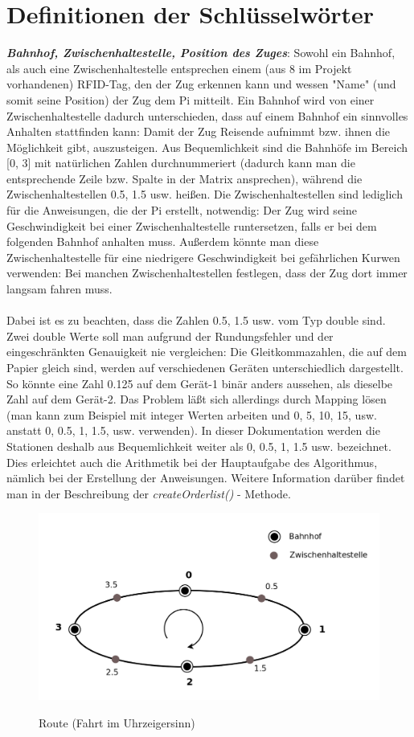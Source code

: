 \section{Definitionen der Schlüsselwörter}
\label{chap:alg_keywords}
\textit{\textbf{Bahnhof, Zwischenhaltestelle, Position des Zuges}}: Sowohl ein Bahnhof, als auch eine Zwischenhaltestelle entsprechen einem (aus 8 im Projekt vorhandenen) RFID-Tag, den der Zug erkennen kann und wessen "Name" (und somit seine Position) der Zug dem Pi mitteilt. Ein Bahnhof wird von einer Zwischenhaltestelle dadurch unterschieden, dass auf einem Bahnhof ein sinnvolles Anhalten stattfinden kann: Damit der Zug Reisende aufnimmt bzw. ihnen die Möglichkeit gibt, auszusteigen. Aus Bequemlichkeit sind die Bahnhöfe im Bereich [0, 3] mit natürlichen Zahlen durchnummeriert (dadurch kann man die entsprechende Zeile bzw. Spalte in der Matrix ansprechen), während die Zwischenhaltestellen 0.5, 1.5 usw. heißen. Die Zwischenhaltestellen sind lediglich für die Anweisungen, die der Pi erstellt, notwendig: Der Zug wird seine Geschwindigkeit bei einer Zwischenhaltestelle runtersetzen, falls er bei dem folgenden Bahnhof anhalten muss. Außerdem könnte man diese Zwischenhaltestelle für eine niedrigere Geschwindigkeit bei gefährlichen Kurwen verwenden: Bei manchen Zwischenhaltestellen festlegen, dass der Zug dort immer langsam fahren muss.\\
\\
Dabei ist es zu beachten, dass die Zahlen 0.5, 1.5 usw. vom Typ double sind. Zwei double Werte soll man aufgrund der Rundungsfehler und der eingeschränkten Genauigkeit nie vergleichen: Die Gleitkommazahlen, die auf dem Papier gleich sind, werden auf verschiedenen Geräten unterschiedlich dargestellt. So könnte eine Zahl 0.125 auf dem Gerät-1 binär anders aussehen, als dieselbe Zahl auf dem Gerät-2. Das Problem läßt sich allerdings durch Mapping lösen (man kann zum Beispiel mit integer Werten arbeiten und 0, 5, 10, 15, usw. anstatt 0, 0.5, 1, 1.5, usw. verwenden). In dieser Dokumentation werden die Stationen deshalb aus Bequemlichkeit weiter als 0, 0.5, 1, 1.5 usw. bezeichnet. Dies erleichtet auch die Arithmetik bei der Hauptaufgabe des Algorithmus, nämlich bei der Erstellung der Anweisungen. Weitere Information darüber findet man in der Beschreibung der \textit{createOrderlist()} - Methode.\\
\begin{figure}[H]	
\caption{Route (Fahrt im Uhrzeigersinn)}
\includegraphics[width=2\textwidth, width=470pt]{content/images/route.png}
\label{pic:route}
\end{figure}
